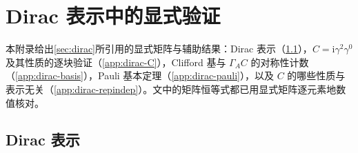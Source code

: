 \documentclass[UTF8,a4paper,11pt,fontset=fandol]{ctexart}
\theoremstyle{cplain}
\theoremstyle{cdefinition}
\theoremstyle{cremark}
\numberwithin{equation}{section}
\newcommand{\ii}{\mathrm{i}}                        %
\begin{document}
\providecommand{\smat}[1]{\bigl(\begin{smallmatrix}#1\end{smallmatrix}\bigr)}
\section{Dirac 表示中的显式验证}\label{app:dirac}

本附录给出\cref{sec:dirac}所引用的显式矩阵与辅助结果：Dirac 表示（\cref{app:dirac-rep}），$C=\ii\gamma^2\gamma^0$ 及其性质的逐块验证（\cref{app:dirac-C}），Clifford 基与 $\Gamma_AC$ 的对称性计数（\cref{app:dirac-basis}），Pauli 基本定理（\cref{app:dirac-pauli}），以及 $C$ 的哪些性质与表示无关（\cref{app:dirac-repindep}）。文中的矩阵恒等式都已用显式矩阵逐元素地数值核对。

\subsection{Dirac 表示}\label{app:dirac-rep}
\end{document}
